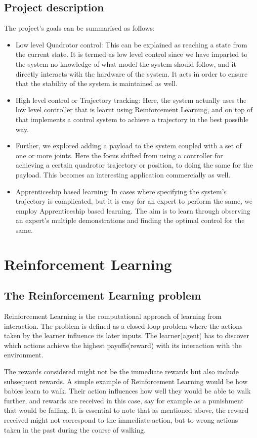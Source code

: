 \documentclass[hidelinks,BTech]{iitmdiss}
\begin{document}
\section{Project description}
The project's goals can be summarised as follows:
\begin{itemize}
	\item {Low level Quadrotor control: This can be explained as reaching a state from the current state. It is termed as low level control since we have imparted to the system no knowledge of what model the system should follow, and it directly interacts with the hardware of the system. It acts in order to ensure that the stability of the system is maintained as well.}
	\item {High level control or Trajectory tracking: Here, the system actually uses the low level controller that is learnt using Reinforcement Learning, and on top of that implements a control system to achieve a trajectory in the best possible way.}
	\item {Further, we explored adding a payload to the system coupled with a set of one or more joints. Here the focus shifted from using a controller for achieving a certain quadrotor trajectory or position, to doing the same for the payload. This becomes an interesting application commercially as well.}
	\item {Apprenticeship based learning: In cases where specifying the system's trajectory is complicated, but it is easy for an expert to perform the same, we employ Apprenticeship based learning. The aim is to learn through observing an expert's multiple demonstrations and finding the optimal control for the same.}
\end{itemize}

\chapter{Reinforcement Learning}
\section {The Reinforcement Learning problem}
Reinforcement Learning is the computational approach of learning from interaction. The problem is defined as a closed-loop problem where the actions taken by the learner influence its later inputs. The learner(agent) has to discover which actions achieve the highest payoffs(reward) with its interaction with the environment. 

The rewards considered might not be the immediate rewards but also include subsequent rewards. A simple example of Reinforcement Learning would be how babies learn to walk. Their action influences how well they would be able to walk further, and rewards are received in this case, say for example as a punishment that would be falling. It is essential to note that as mentioned above, the reward received might not correspond to the immediate action, but to wrong actions taken in the past during the course of walking.
\end{document}
